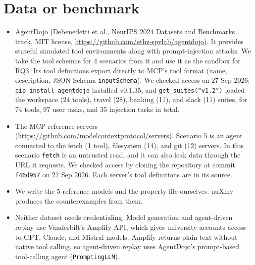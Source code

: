 \documentclass[10pt]{article}
\newcommand{\act}[1]{\texttt{#1}}
\begin{document}
\section{Data or benchmark}
\begin{itemize}
\item AgentDojo (Debenedetti et al., NeurIPS 2024 Datasets and Benchmarks track, MIT license,
  \url{https://github.com/ethz-spylab/agentdojo}). It provides stateful simulated tool environments
  along with prompt-injection attacks. We take the tool schemas for 4 scenarios from it and use it as
  the sandbox for RQ3. Its tool definitions export directly to MCP's tool format (name, description,
  JSON Schema \texttt{inputSchema}). We checked access on 27 Sep 2026: \texttt{pip install
  agentdojo} installed v0.1.35, and \texttt{get\_suites("v1.2")} loaded the workspace (24 tools),
  travel (28), banking (11), and slack (11) suites, for 74 tools, 97 user tasks, and 35 injection
  tasks in total.
\item The MCP reference servers (\url{https://github.com/modelcontextprotocol/servers}). Scenario 5
  is an agent connected to the fetch (1 tool), filesystem (14), and git (12) servers. In this
  scenario \act{fetch} is an untrusted read, and it can also leak data through the URL it requests.
  We checked access by cloning the repository at commit \texttt{f46d957} on 27 Sep 2026. Each
  server's tool definitions are in its source.
\item We write the 5 reference models and the property file ourselves. nuXmv produces the
  counterexamples from them.
\item Neither dataset needs credentialing. Model generation and agent-driven replay use
  Vanderbilt's Amplify API, which gives university accounts access to GPT, Claude, and Mistral
  models. Amplify returns plain text without native tool calling, so agent-driven replay uses
  AgentDojo's prompt-based tool-calling agent (\texttt{PromptingLLM}).
\end{itemize}
\end{document}
